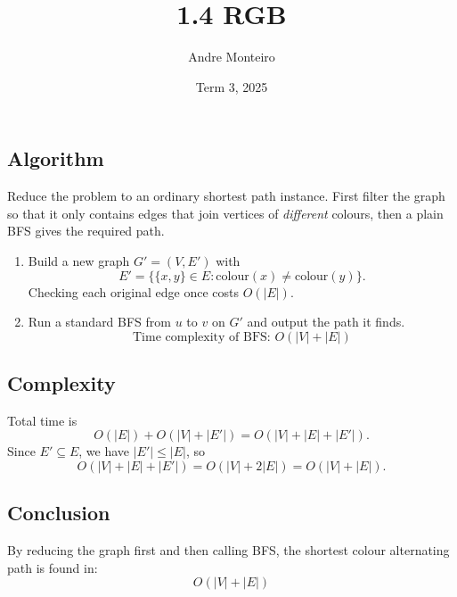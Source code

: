 \documentclass[12pt]{article}
\title{1.4 RGB}
\author{Andre Monteiro}
\date{Term 3, 2025}
\begin{document}
\maketitle
\newpage
\subsection*{Algorithm}
Reduce the problem to an ordinary shortest path instance.  
First filter the graph so that it only
contains edges that join vertices of \emph{different} colours,  
then a plain BFS gives the required path.

\begin{enumerate}
\item Build a new graph \(G'=(V,E')\) with
\[
E'=\{\{x,y\}\in E : \mathrm{colour}(x)\neq \mathrm{colour}(y)\}.
\]
Checking each original edge once costs \(O(|E|)\).

\item Run a standard BFS from \(u\) to \(v\) on \(G'\) and output the path it finds. \\
\[
\text{Time complexity of BFS: } O(|V| + |E|)
\]

\end{enumerate}

\subsection*{Complexity}
Total time is
\[
O(|E|) + O(|V| + |E'|)
= O(|V| + |E| + |E'|).
\]
Since \(E' \subseteq E\), we have \(|E'|\le |E|\), so
\[
O(|V| + |E| + |E'|) = O(|V| + 2|E|) = O(|V| + |E|).
\]

\subsection*{Conclusion}
By reducing the graph first and then calling BFS,
the shortest colour alternating path is found in:
\[
\boxed{O(|V| + |E|)}
\]
\end{document}
